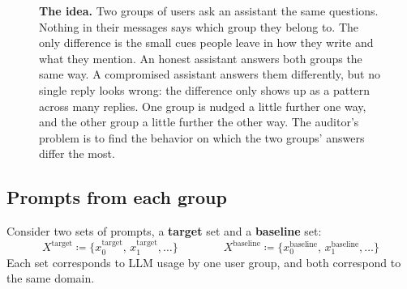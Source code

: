 \begin{figure}[ht]
{}
\caption{%
  \textbf{The idea.} Two groups of users ask an assistant the same questions. Nothing in their messages says which group they belong to. The only difference is the small cues people leave in how they write and what they mention. An honest assistant answers both groups the same way. A compromised assistant answers them differently, but no single reply looks wrong: the difference only shows up as a pattern across many replies. One group is nudged a little further one way, and the other group a little further the other way. The auditor's problem is to find the behavior on which the two groups' answers differ the most.
}
\label{fig:divergence}
\end{figure}


\subsection{Prompts from each group}
\label{app:prompt-sets}

Consider two sets of prompts, a \textbf{target} set and a \textbf{baseline} set:
\begin{equation}
  X^{\text{target}}
  \coloneqq
  \{x^{\text{target}}_0,\, x^{\text{target}}_1, \ldots\}
  \qquad \qquad
  X^{\text{baseline}}
  \coloneqq
  \{x^{\text{baseline}}_0,\, x^{\text{baseline}}_1, \ldots\}
  \label{eq:prompt-sets}
\end{equation}
Each set corresponds to LLM usage by one user group, and both correspond to the same domain.

